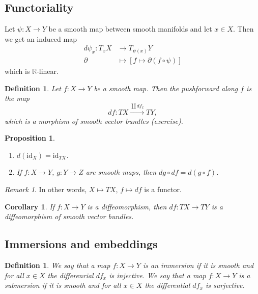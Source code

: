 \documentclass[12pt]{article}
\theoremstyle{darkgreentheorem}
\newtheorem{prop}[thm]{Proposition}
\newtheorem{cor}[thm]{Corollary}
\theoremstyle{darkbluedefinition}
\newtheorem{defn}[thm]{Definition}
\theoremstyle{darkredexample}
\theoremstyle{remark}
\newtheorem{rem}[thm]{Remark}
\newcommand{\R}{\mathbb{R}}
\newcommand{\1}{\mathbbm{1}}
\newcommand{\id}{\mathrm{id}}
\begin{document}
\subsection{Functoriality}

Let $\psi\colon X\to Y$ be a smooth map between smooth manifolds and let $x\in X$.
Then we get an induced map
\begin{align*}
    d\psi_{x}\colon T_{x}X&\longrightarrow T_{\psi(x)}Y \\
    \partial &\longmapsto [f\mapsto \partial(f\circ \psi)]
\end{align*}
which is $\R$-linear.

\begin{defn}
    Let $f\colon X\to Y$ be a smooth map.
    Then the \textit{pushforward along $f$} is the map
    \[df\colon TX\xrightarrow{\coprod df_{x}} TY, \]
    which is a morphism of smooth vector bundles (exercise).
\end{defn}

\begin{prop}
    \begin{enumerate}
	\item $d(\id_{X})=\id_{TX}$.
	\item If $f\colon X\to Y$, $g\colon Y\to Z$ are smooth maps, then $dg\circ df=d(g\circ f)$.
    \end{enumerate}
\end{prop}

\begin{rem}
    In other words, $X\mapsto TX$, $f\mapsto df$ is a functor.
\end{rem}

\begin{cor}
    If $f\colon X\to Y$ is a diffeomorphism, then $df\colon TX\to TY$ is a diffeomorphism of smooth vector bundles.
\end{cor}

\subsection{Immersions and embeddings}

\begin{defn}
    We say that a map $f\colon X\to Y$ is an \textit{immersion} if it is smooth and for all $x\in X$ the differenrial $df_{x}$ is injective.
    We say that a map $f\colon X\to Y$ is a \textit{submersion} if it is smooth and for all $x\in X$ the differential $df_{x}$ is surjective.
\end{defn}
\end{document}
